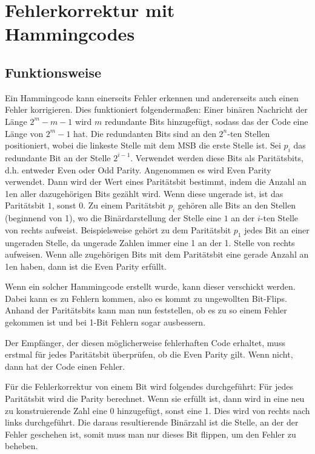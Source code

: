 \section{Fehlerkorrektur mit Hammingcodes}

\subsection{Funktionsweise} \label{sec:hammingfunc}
Ein Hammingcode kann einerseits Fehler erkennen und andererseits auch einen Fehler korrigieren.
Dies funktioniert folgendermaßen: Einer binären Nachricht der Länge $2^m - m - 1$ wird $m$ redundante Bits
hinzugefügt, sodass das der Code eine Länge von $2^m - 1$ hat. Die redundanten Bits sind an den $2^n$-ten Stellen positioniert, wobei
die linkeste Stelle mit dem MSB die erste Stelle ist.
Sei $p_i$ das redundante Bit an der Stelle $2^{i - 1}$. Verwendet werden diese Bits als Paritätsbits, d.h. entweder Even oder Odd Parity.
Angenommen es wird Even Parity verwendet. Dann wird der Wert eines Paritätsbit bestimmt, indem die Anzahl an 1en aller dazugehörigen Bits
gezählt wird. Wenn diese ungerade ist, ist das Paritätsbit $1$, sonst $0$. Zu einem Paritätsbit $p_i$ gehören alle Bits an den Stellen
(beginnend von 1), wo die Binärdarstellung der Stelle eine $1$ an der $i$-ten Stelle von rechts aufweist. Beispielsweise gehört zu dem Paritätsbit $p_1$
jedes Bit an einer ungeraden Stelle, da ungerade Zahlen immer eine 1 an der 1. Stelle von rechts aufweisen. Wenn alle zugehörigen Bits mit dem
Paritätsbit eine gerade Anzahl an 1en haben, dann ist die Even Parity erfüllt. \cite{hamming}

Wenn ein solcher Hammingcode erstellt wurde, kann dieser verschickt werden. Dabei kann es zu Fehlern kommen, also es kommt zu ungewollten
Bit-Flips. Anhand der Paritätsbits kann man nun feststellen, ob es zu so einem Fehler gekommen ist und bei 1-Bit Fehlern sogar ausbessern. \cite{hamming}

Der Empfänger, der diesen möglicherweise fehlerhaften Code erhaltet, muss erstmal für jedes Paritätsbit überprüfen, ob die Even Parity gilt.
Wenn nicht, dann hat der Code einen Fehler. \cite{hamming}

Für die Fehlerkorrektur von einem Bit wird folgendes durchgeführt: Für jedes Paritätsbit wird die Parity berechnet. Wenn sie erfüllt ist, dann
wird in eine neu zu konstruierende Zahl eine 0 hinzugefügt, sonst eine 1. Dies wird von rechts nach links durchgeführt. Die daraus resultierende
Binärzahl ist die Stelle, an der der Fehler geschehen ist, somit muss man nur dieses Bit flippen, um den Fehler zu beheben. \cite{hamming}

